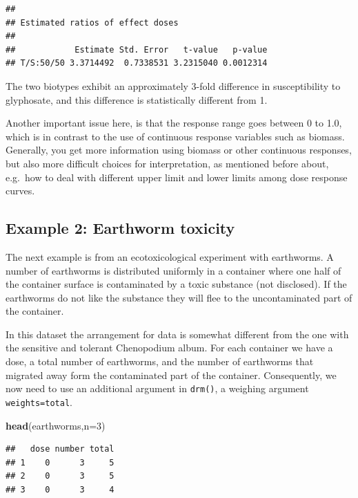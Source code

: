 \documentclass[letterpaper,]{book}
\newenvironment{Shaded}{\begin{snugshade}}{\end{snugshade}}
\newcommand{\DataTypeTok}[1]{\textcolor[rgb]{0.13,0.29,0.53}{#1}}
\newcommand{\DecValTok}[1]{\textcolor[rgb]{0.00,0.00,0.81}{#1}}
\newcommand{\KeywordTok}[1]{\textcolor[rgb]{0.13,0.29,0.53}{\textbf{#1}}}
\newcommand{\NormalTok}[1]{#1}
\begin{document}
\begin{verbatim}
## 
## Estimated ratios of effect doses
## 
##            Estimate Std. Error   t-value   p-value
## T/S:50/50 3.3714492  0.7338531 3.2315040 0.0012314
\end{verbatim}

The two biotypes exhibit an approximately 3-fold difference in susceptibility to glyphosate, and this difference is statistically different from 1.

Another important issue here, is that the response range goes between 0 to 1.0, which is in contrast to the use of continuous response variables such as biomass. Generally, you get more information using biomass or other continuous responses, but also more difficult choices for interpretation, as mentioned before about, e.g.~how to deal with different upper limit and lower limits among dose response curves.

\hypertarget{example-2-earthworm-toxicity}{%
\subsection{Example 2: Earthworm toxicity}\label{example-2-earthworm-toxicity}}

The next example is from an ecotoxicological experiment with earthworms. A number of earthworms is distributed uniformly in a container where one half of the container surface is contaminated by a toxic substance (not disclosed). If the earthworms do not like the substance they will flee to the uncontaminated part of the container.

In this dataset the arrangement for data is somewhat different from the one with the sensitive and tolerant Chenopodium album. For each container we have a dose, a total number of earthworms, and the number of earthworms that migrated away form the contaminated part of the container. Consequently, we now need to use an additional argument in \texttt{drm()}, a weighing argument \texttt{weights=total}.



\begin{Shaded}
\begin{Highlighting}[]
\KeywordTok{head}\NormalTok{(earthworms,}\DataTypeTok{n=}\DecValTok{3}\NormalTok{)}
\end{Highlighting}
\end{Shaded}

\begin{verbatim}
##   dose number total
## 1    0      3     5
## 2    0      3     5
## 3    0      3     4
\end{verbatim}
\end{document}
